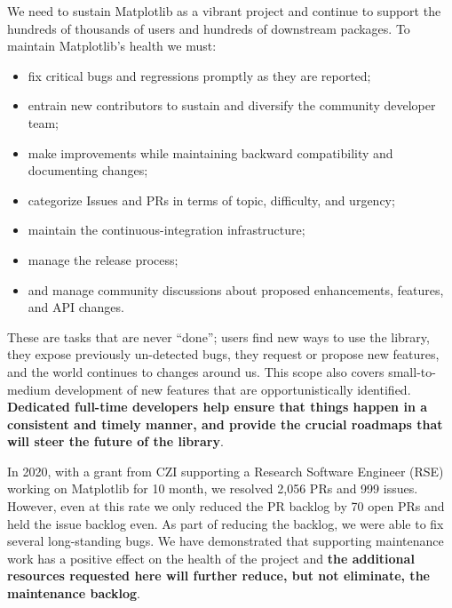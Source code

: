 \documentclass[12pt]{article}
\numberwithin{page}{section}
\begin{document}
We need to sustain Matplotlib as a vibrant project and continue to support the
hundreds of thousands of users and hundreds of downstream packages.  To maintain
Matplotlib's health we must:
\begin{itemize}[noitemsep]
\item fix critical bugs and regressions promptly as they are reported;
\item entrain new contributors to sustain and diversify the community
  developer team;
\item make improvements while maintaining backward compatibility and
  documenting changes;
\item categorize Issues and PRs in terms of topic, difficulty, and
  urgency;
\item maintain the continuous-integration infrastructure;
\item manage the release process;
\item and manage community discussions about proposed enhancements, features,
  and API changes.
\end{itemize}
These are tasks that are never ``done''; users find new ways to use the
library, they expose previously un-detected bugs, they request or propose new
features, and the world continues to changes around us.  This scope also covers
small-to-medium development of new features that are opportunistically
identified.  \textbf{Dedicated full-time developers help ensure that things
  happen in a consistent and timely manner, and provide the crucial roadmaps
  that will steer the future of the library}.



In 2020, with a grant from CZI supporting a Research Software Engineer
(RSE) working on Matplotlib for 10 month, we resolved 2,056 PRs and
999 issues.  However, even at this rate we only reduced the PR backlog
by 70 open PRs and held the issue backlog even.  As part of reducing
the backlog, we were able to fix several long-standing bugs.  We have
demonstrated that supporting maintenance work has a positive effect on
the health of the project and \textbf{the additional resources
  requested here will further reduce, but not eliminate, the
  maintenance backlog}.
\end{document}
